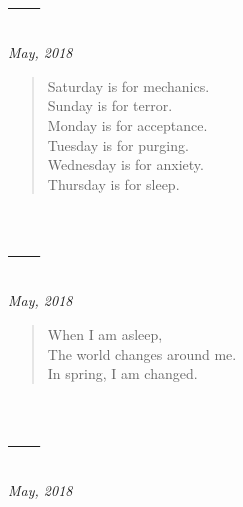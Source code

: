 \section{---}

\hfill\textit{May, 2018}

\begin{verse}
Saturday is for mechanics.\\
Sunday is for terror.\\
Monday is for acceptance.\\
Tuesday is for purging.\\
Wednesday is for anxiety.\\
Thursday is for sleep.
\end{verse}

\newpage
\section{---}

\hfill\textit{May, 2018}

\begin{verse}
When I am asleep,\\
The world changes around me.\\
In spring, I am changed.
\end{verse}

\newpage
\section{---}

\hfill\textit{May, 2018}


